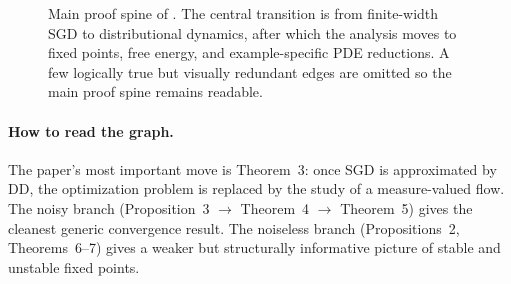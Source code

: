 \begin{figure}[H]
\caption{Main proof spine of \cite{mei2018meanfield}. The central transition is from finite-width SGD to distributional dynamics, after which the analysis moves to fixed points, free energy, and example-specific PDE reductions. A few logically true but visually redundant edges are omitted so the main proof spine remains readable.}
\end{figure}

\paragraph{How to read the graph.}
The paper's most important move is Theorem~3: once SGD is approximated by DD, the optimization problem is replaced by the study of a measure-valued flow. The noisy branch (Proposition~3 $\to$ Theorem~4 $\to$ Theorem~5) gives the cleanest generic convergence result. The noiseless branch (Propositions~2, Theorems~6--7) gives a weaker but structurally informative picture of stable and unstable fixed points.
